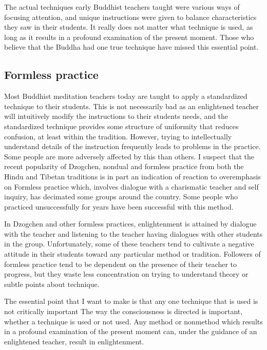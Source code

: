 \documentclass[a5paper,10pt,english]{book}
\begin{document}
\sphinxAtStartPar
The actual techniques early Buddhist teachers taught were various ways
of focusing attention, and unique instructions were given to balance
characteristics they saw in their students. It really does not matter
what technique is used, as long as it results in a profound examination
of the present moment. Those who believe that the Buddha had one true
technique have missed this essential point.


\subsection{Formless practice}
\label{\detokenize{saints:formless-practice}}
\sphinxAtStartPar
Most Buddhist meditation teachers today are taught to apply a
standardized technique to their students. This is not necessarily bad as
an enlightened teacher will intuitively modify the instructions to their
students needs, and the standardized technique provides some structure
of uniformity that reduces confusion, at least within the tradition.
However, trying to intellectually understand details of the instruction
frequently leads to problems in the practice. Some people are more
adversely affected by this than others. I suspect that the recent
popularity of Dzogchen, non\sphinxhyphen{}dual and formless practice from both the
Hindu and Tibetan traditions is in part an indication of reaction to
overemphasis on  Formless practice which, involves
dialogue with a charismatic teacher and self inquiry, has decimated some
 groups around the country. Some people who practiced
 unsuccessfully for years have been successful with this
method.

\sphinxAtStartPar
In Dzogchen and other formless practices, enlightenment is attained by
dialogue with the teacher and listening to the teacher having dialogues
with other students in the group. Unfortunately, some of these teachers
tend to cultivate a negative attitude in their students toward any
particular method or tradition. Followers of formless practice tend to
be dependent on the presence of their teacher to progress, but they
waste less concentration on trying to understand theory or subtle points
about technique.

\sphinxAtStartPar
The essential point that I want to make is that any one technique that
is used is not critically important The way the consciousness is
directed is important, whether a technique is used or not used. Any
method or non\sphinxhyphen{}method which results in a profound examination of the
present moment can, under the guidance of an enlightened teacher, result
in enlightenment.
\end{document}
